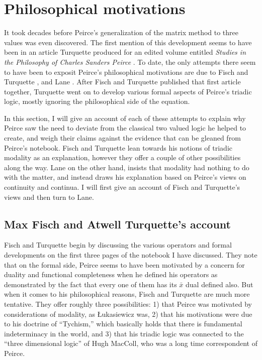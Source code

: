 \chapter{Philosophical motivations}

It took decades before Peirce's generalization of the matrix method to three values was even discovered. The first mention of this development seems to have been in an article Turquette produced for an edited volume entitled \textit{Studies in the Philosophy of Charles Sanders Peirce} \citep{turquette1964studies}. To date, the only attempts there seem to have been to exposit Peirce's philosophical motivations are due to Fisch and Turquette \citeyearpar{fisch_peirces_1966}, and Lane \citeyearpar{lane_peirces_1999}. After Fisch and Turquette published that first article together, Turquette went on to develop various formal aspects of Peirce's triadic logic, mostly ignoring the philosophical side of the equation.

In this section, I will give an account of each of these attempts to explain why Peirce saw the need to deviate from the classical two valued logic he helped to create, and weigh their claims against the evidence that can be gleaned from Peirce's notebook. Fisch and Turquette lean towards his notions of triadic modality as an explanation, however they offer a couple of other possibilities along the way. Lane on the other hand, insists that modality had nothing to do with the matter, and instead draws his explanation based on Peirce's views on continuity and continua. I will first give an account of Fisch and Turquette's views and then turn to Lane.

\section{Max Fisch and Atwell Turquette's account}

Fisch and Turquette begin by discussing the various operators and formal developments on the first three pages of the notebook I have discussed. They note that on the formal side, Peirce seems to have been motivated by a concern for duality and functional completeness when he defined his operators as demonstrated by the fact that every one of them has its $\bar{x}$ dual defined also. But when it comes to his philosophical reasons, Fisch and Turquette are much more tentative. They offer roughly three possibilities: 1) that Peirce was motivated by considerations of modality, as Łukasiewicz was, 2) that his motivations were due to his doctrine of ``Tychism,'' which basically holds that there is fundamental indeterminacy in the world, and 3) that his triadic logic was connected to the ``three dimensional logic'' of Hugh MacColl, who was a long time correspondent of Peirce.

